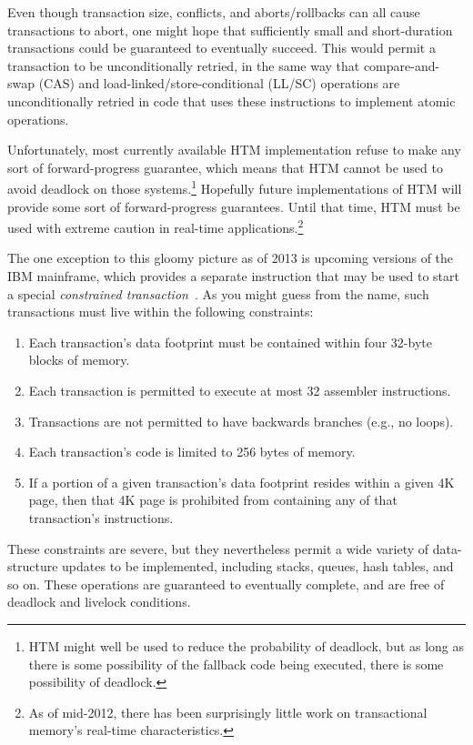 Even though transaction size, conflicts, and aborts/rollbacks can all
cause transactions to abort, one might hope that sufficiently small and
short-duration transactions could be guaranteed to eventually succeed.
This would permit a transaction to be unconditionally retried, in the
same way that compare-and-swap (CAS) and load-linked/store-conditional
(LL/SC) operations are unconditionally retried in code that uses these
instructions to implement atomic operations.

Unfortunately, most currently available HTM implementation refuse to
make any
sort of forward-progress guarantee, which means that HTM cannot be
used to avoid deadlock on those systems.\footnote{
	HTM might well be used to reduce the probability of deadlock,
	but as long as there is some possibility of the fallback
	code being executed, there is some possibility of deadlock.}
Hopefully future implementations of HTM will provide some sort of
forward-progress guarantees.
Until that time, HTM must be used with extreme caution in real-time
applications.\footnote{
	As of mid-2012, there has been surprisingly little work on
	transactional memory's real-time characteristics.}

The one exception to this gloomy picture as of 2013 is upcoming versions
of the IBM mainframe, which provides a separate instruction that may be
used to start a special
\emph{constrained transaction}~\cite{ChristianJacobi2012MainframeTM}.
As you might guess from the name, such transactions must live within
the following constraints:

\begin{enumerate}
\item	Each transaction's data footprint must be contained within
	four 32-byte blocks of memory.
\item	Each transaction is permitted to execute at most 32 assembler
	instructions.
\item	Transactions are not permitted to have backwards branches
	(e.g., no loops).
\item	Each transaction's code is limited to 256 bytes of memory.
\item	If a portion of a given transaction's data footprint resides
	within a given 4K page, then that 4K page is prohibited from
	containing any of that transaction's instructions.
\end{enumerate}

These constraints are severe, but they nevertheless permit a wide variety
of data-structure updates to be implemented, including stacks, queues,
hash tables, and so on.
These operations are guaranteed to eventually complete, and are free of
deadlock and livelock conditions.

